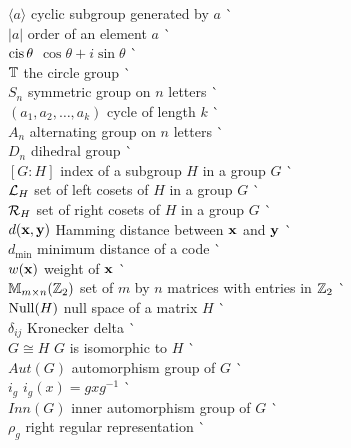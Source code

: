 \begin{tabbing}
$\langle a \rangle$ \> cyclic subgroup generated by $a$ \>
     \` \pageref{generatedby} \\  
$|a|$ \> order of an element $a$ \> \`
     \pageref{noteelementorder} \\
$\operatorname{cis} \theta$ \> $\cos \theta + i \sin \theta$ \> 
     \` \pageref{cosisin} \\
${\Bbb T}$ \> the circle group \> \` \pageref{notecirclegroup} \\
$S_n$ \> symmetric group on $n$ letters \> 
     \` \pageref{symmetricgroup} \\
$(a_1, a_2, \ldots, a_k )$ \> cycle of length $k$ \> 
     \` \pageref{notecycle} \\
$A_n$ \> alternating group on $n$ letters \> 
     \` \pageref{alternatinggroup} \\
$D_n$ \> dihedral group \> \` \pageref{dihedralgroup} \\
$[G:H]$ \> index of a subgroup $H$ in a group $G$ \> 
     \` \pageref{indexofasubgroup}  \\
${\cal L}_H$ \> set of left cosets of $H$ in a group $G$ \> 
     \` \pageref{notesetleft} \\
${\cal R}_H$ \> set of right cosets of $H$ in a group $G$ \>
     \` \pageref{notesetright}  \\
$d({\bold x}, {\bold y})$ \> Hamming distance between ${\bold x}$ and
     ${\bold y}$ \> \` \pageref{noteHammingdist} \\
$d_{\min}$ \> minimum distance of a code \> \` \pageref{notemindist}\\ 
$w({\bold x})$ \> weight of ${\bold x}$ \> \` \pageref{noteweight} \\
${\Bbb M}_{m \times n}({\Bbb Z}_2)$ \> set of $m$ by $n$ matrices with 
     entries in ${\Bbb Z}_2$ \> \` \pageref{notembyn} \\
${\rm Null}(H)$ \> null space of a matrix $H$ \> 
     \` \pageref{notenull} \\
$\delta_{ij}$ \> Kronecker delta \> \` \pageref{notekron} \\
$G \cong H$ \> $G$ is isomorphic to $H$ \> \` \pageref{noteisomorph} \\
$Aut(G)$ \> automorphism group of $G$ \> \` \pageref{noteauto} \\
$i_g$ \> $i_g(x) = gxg^{-1}$ \> \` \pageref{noteinner} \\
$Inn(G)$ \> inner automorphism group of $G$ \> \` \pageref{noteinneraut} \\
$\rho_g$ \> right regular representation \> \` \pageref{noterightreg}
\end{tabbing} \clearpage
